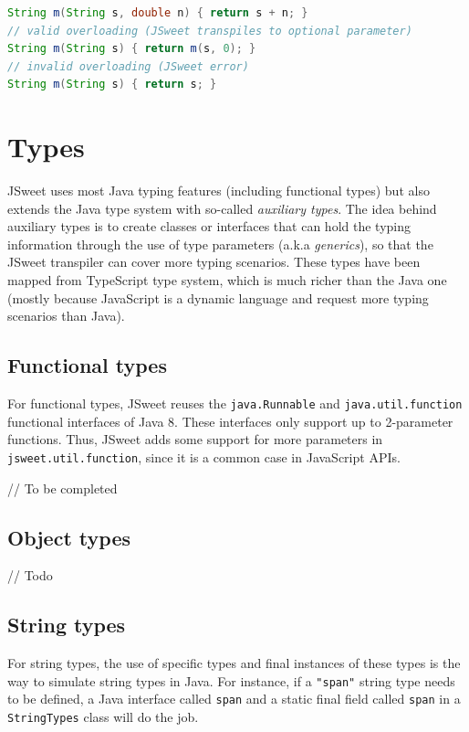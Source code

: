 \documentclass[a4paper]{report}
\begin{document}
\begin{lstlisting}[language=Java]
String m(String s, double n) { return s + n; }
// valid overloading (JSweet transpiles to optional parameter)
String m(String s) { return m(s, 0); }
// invalid overloading (JSweet error)
String m(String s) { return s; }
\end{lstlisting}

\chapter{Types}

JSweet uses most Java typing features (including functional types) but also extends the Java type system with so-called \emph{auxiliary types}. The idea behind auxiliary types is to create classes or interfaces that can hold the typing information through the use of type parameters (a.k.a \emph{generics}), so that the JSweet transpiler can cover more typing scenarios. These types have been mapped from TypeScript type system, which is much richer than the Java one (mostly because JavaScript is a dynamic language and request more typing scenarios than Java). 

\section{Functional types}

For functional types, JSweet reuses the \texttt{java.\-Runnable} and \texttt{java.\-util.\-function} functional interfaces of Java 8. These interfaces only support up to 2-parameter functions. Thus, JSweet adds some support for more parameters in \texttt{jsweet.\-util.\-function}, since it is a common case in JavaScript APIs.

// To be completed

\section{Object types}

// Todo

\section{String types}

For string types, the use of specific types and final instances of these types is the way to simulate string types in Java. For instance, if a \texttt{"span"} string type needs to be defined, a Java interface called \texttt{span} and a static final field called \texttt{span} in a \texttt{StringTypes} class will do the job. 
\end{document}
